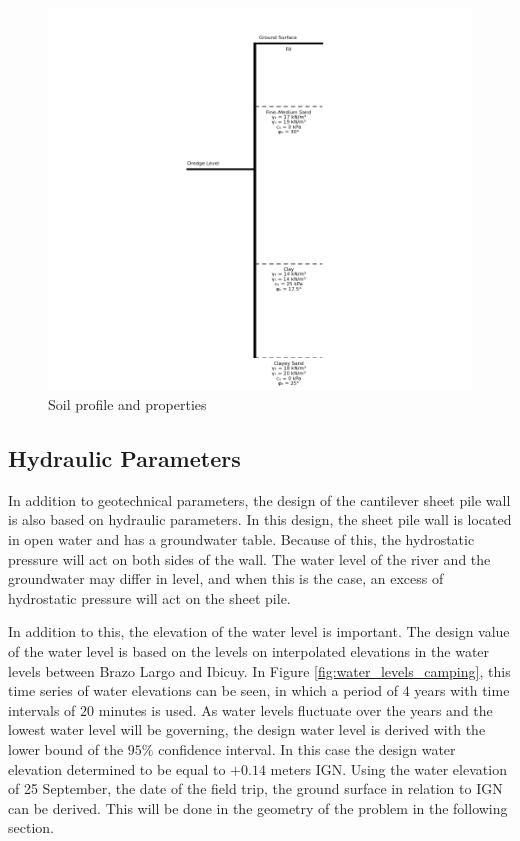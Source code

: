 \begin{figure}[H]
    \centering
    \includegraphics[width=0.90\linewidth]{figures/ch8/soil_profile.png}
    \caption{Soil profile and properties}
    \label{fig:soil_profile_cross_section}
\end{figure}

\subsection{Hydraulic Parameters}
\label{section:hydraulic_parameters}

In addition to geotechnical parameters, the design of the cantilever sheet pile wall is also based on hydraulic parameters. In this design, the sheet pile wall is located in open water and has a groundwater table. Because of this, the hydrostatic pressure will act on both sides of the wall. The water level of the river and the groundwater may differ in level, and when this is the case, an excess of hydrostatic pressure will act on the sheet pile. 

In addition to this, the elevation of the water level is important. The design value of the water level is based on the levels on interpolated elevations in the water levels between Brazo Largo and Ibicuy. In Figure \ref{fig:water_levels_camping}, this time series of water elevations can be seen, in which a period of $4$ years with time intervals of $20$ minutes is used. As water levels fluctuate over the years and the lowest water level will be governing, the design water level is derived with the lower bound of the $95\%$ confidence interval. In this case the design water elevation determined to be equal to $+0.14$ meters IGN. Using the water elevation of 25 September, the date of the field trip, the ground surface in relation to IGN can be derived. This will be done in the geometry of the problem in the following section. 

